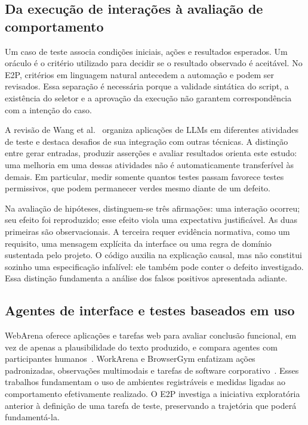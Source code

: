 \documentclass[12pt]{article}
\begin{document}
\subsection{Da execução de interações à avaliação de comportamento}
Um caso de teste associa condições iniciais, ações e resultados esperados. Um oráculo é o critério utilizado para decidir se o resultado observado é aceitável. No E2P, critérios em linguagem natural antecedem a automação e podem ser revisados. Essa separação é necessária porque a validade sintática do script, a existência do seletor e a aprovação da execução não garantem correspondência com a intenção do caso.

A revisão de Wang et al.~\cite{wang2024survey} organiza aplicações de LLMs em diferentes atividades de teste e destaca desafios de sua integração com outras técnicas. A distinção entre gerar entradas, produzir asserções e avaliar resultados orienta este estudo: uma melhoria em uma dessas atividades não é automaticamente transferível às demais. Em particular, medir somente quantos testes passam favorece testes permissivos, que podem permanecer verdes mesmo diante de um defeito.

Na avaliação de hipóteses, distinguem-se três afirmações: uma interação ocorreu; seu efeito foi reproduzido; esse efeito viola uma expectativa justificável. As duas primeiras são observacionais. A terceira requer evidência normativa, como um requisito, uma mensagem explícita da interface ou uma regra de domínio sustentada pelo projeto. O código auxilia na explicação causal, mas não constitui sozinho uma especificação infalível: ele também pode conter o defeito investigado. Essa distinção fundamenta a análise dos falsos positivos apresentada adiante.

\subsection{Agentes de interface e testes baseados em uso}
WebArena oferece aplicações e tarefas web para avaliar conclusão funcional, em vez de apenas a plausibilidade do texto produzido, e compara agentes com participantes humanos~\cite{zhou2024webarena}. WorkArena e BrowserGym enfatizam ações padronizadas, observações multimodais e tarefas de software corporativo~\cite{drouin2024workarena}. Esses trabalhos fundamentam o uso de ambientes registráveis e medidas ligadas ao comportamento efetivamente realizado. O E2P investiga a iniciativa exploratória anterior à definição de uma tarefa de teste, preservando a trajetória que poderá fundamentá-la.
\end{document}
